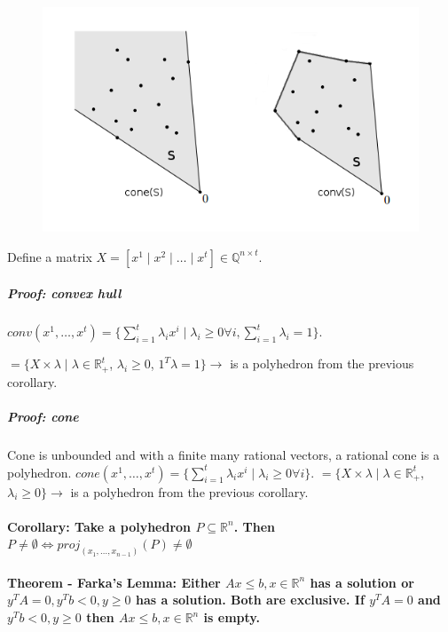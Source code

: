 \documentclass[main]{subfiles}
\begin{document}
\begin{figure}[!h]
  \label{fig:projection}
  \centering
    \includegraphics{imgs/conv-cone.png}
\end{figure}

Define a matrix $X =[x^1 \mid x^2 \mid \dots \mid x^t] \in
\mathbb{Q}^{n \times t}$.

\subparagraph{Proof: convex hull}
$conv(x^1, \dots, x^t) = \{ \sum_{i=1}^{t} \lambda_i x^i \mid \lambda_i \geq 0
\forall i, \sum_{i=1}^t \lambda_i = 1 \}$.

$ = \{ X \times \lambda \mid \lambda \in \mathbb{R}^t_+$, $\lambda_i \geq 0$, 
$\mathcal{1}^T \lambda = 1 \} \rightarrow $ is a polyhedron from the previous
corollary.

\subparagraph{Proof: cone}
Cone is unbounded and with a finite many rational vectors, a rational cone is a 
polyhedron.
$cone(x^1, \dots, x^t) = \{ \sum_{i=1}^{t} \lambda_i x^i \mid \lambda_i \geq 0
\forall i \}$.
$ = \{ X \times \lambda \mid \lambda \in \mathbb{R}^t_+$, $\lambda_i \geq 0 \}
\rightarrow $ is a polyhedron from the previous corollary.

\paragraph{Corollary: Take a polyhedron $P \subseteq \mathbb{R}^n$. Then $P
\neq \emptyset \iff proj_{(x_1, \dots, x_{n-1})}(P) \neq \emptyset$}

\paragraph{Theorem - Farka's Lemma: Either $Ax \leq b, x \in \mathbb{R}^n$ has
a solution or $y^T A = 0, y^T b < 0, y \geq 0$ has a solution. Both are
exclusive. If $y^T A = 0$ and $y^T b < 0, y \geq 0$ then $Ax \leq b, x \in
\mathbb{R}^n$ is empty.}
\end{document}
